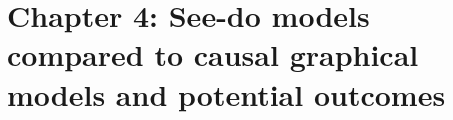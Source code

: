 

\chapter{Chapter 4: See-do models compared to causal graphical models and potential outcomes}\label{ch:4}